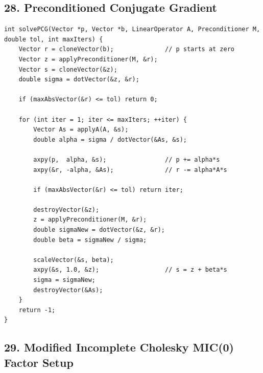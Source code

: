 \documentclass[10pt,letterpaper]{article}
\begin{document}
\subsection*{28. Preconditioned Conjugate Gradient}

\begin{verbatim}
int solvePCG(Vector *p, Vector *b, LinearOperator A, Preconditioner M, double tol, int maxIters) {
    Vector r = cloneVector(b);              // p starts at zero
    Vector z = applyPreconditioner(M, &r);
    Vector s = cloneVector(&z);
    double sigma = dotVector(&z, &r);

    if (maxAbsVector(&r) <= tol) return 0;

    for (int iter = 1; iter <= maxIters; ++iter) {
        Vector As = applyA(A, &s);
        double alpha = sigma / dotVector(&As, &s);

        axpy(p,  alpha, &s);                // p += alpha*s
        axpy(&r, -alpha, &As);              // r -= alpha*A*s

        if (maxAbsVector(&r) <= tol) return iter;

        destroyVector(&z);
        z = applyPreconditioner(M, &r);
        double sigmaNew = dotVector(&z, &r);
        double beta = sigmaNew / sigma;

        scaleVector(&s, beta);
        axpy(&s, 1.0, &z);                  // s = z + beta*s
        sigma = sigmaNew;
        destroyVector(&As);
    }
    return -1;
}
\end{verbatim}

\subsection*{29. Modified Incomplete Cholesky MIC(0) Factor Setup}
\end{document}
